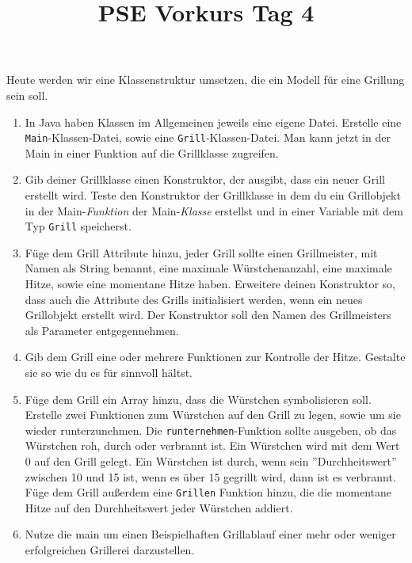 \documentclass{../../sheet}
\title{PSE Vorkurs Tag 4}
\begin{document}
\maketitle

\newpage

Heute werden wir eine Klassenstruktur umsetzen, die ein Modell für eine Grillung sein soll.

\begin{enumerate}
    \item In Java haben Klassen im Allgemeinen jeweils eine eigene Datei. Erstelle eine \texttt{Main}-Klassen-Datei, sowie eine \texttt{Grill}-Klassen-Datei. Man kann jetzt in der Main in einer Funktion auf die Grillklasse zugreifen. 
    \item Gib deiner Grillklasse einen Konstruktor, der ausgibt, dass ein neuer Grill erstellt wird. Teste den Konstruktor der Grillklasse in dem du ein Grillobjekt in der Main-\textit{Funktion} der Main-\textit{Klasse} erstellst und in einer Variable mit dem Typ \texttt{Grill} speicherst.
    \item Füge dem Grill Attribute hinzu, jeder Grill sollte einen Grillmeister, mit Namen als String benannt, eine maximale Würstchenanzahl, eine maximale Hitze, sowie eine momentane Hitze haben. Erweitere deinen Konstruktor so, dass auch die Attribute des Grills initialisiert werden, wenn ein neues Grillobjekt erstellt wird. Der Konstruktor soll den Namen des Grillmeisters als Parameter entgegennehmen.
    \item Gib dem Grill eine oder mehrere Funktionen zur Kontrolle der Hitze. Gestalte sie so wie du es für sinnvoll hältst.
    \item Füge dem Grill ein Array hinzu, dass die Würstchen symbolisieren soll. Erstelle zwei Funktionen zum Würstchen auf den Grill zu legen, sowie um sie wieder runterzunehmen. Die \texttt{runternehmen}-Funktion sollte ausgeben, ob das Würstchen roh, durch oder verbrannt ist. Ein Würstchen wird mit dem Wert 0 auf den Grill gelegt. Ein Würstchen ist durch, wenn sein ''Durchheitswert'' zwischen 10 und 15 ist, wenn es über 15 gegrillt wird, dann ist es verbrannt. \\
    Füge dem Grill außerdem eine \texttt{Grillen} Funktion hinzu, die die momentane Hitze auf den Durchheitswert jeder Würstchen addiert.
    \item Nutze die main um einen Beispielhaften Grillablauf einer mehr oder weniger erfolgreichen Grillerei darzustellen. 
\end{enumerate}
\end{document}

